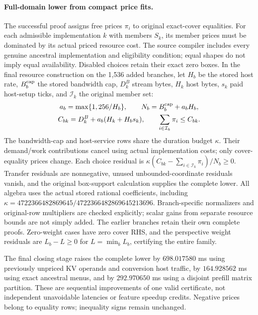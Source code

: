 \paragraph{Full-domain lower from compact price fits.}
The successful proof assigns free prices $\pi_i$ to original exact-cover
equalities. For each admissible implementation $k$ with members $S_k$, its
member prices must be dominated by its actual priced resource cost. The source
compiler includes every genuine ancestral implementation and eligibility
condition; equal shapes do not imply equal availability. Disabled choices retain
their exact zero boxes. In the final resource construction on the 1,536 added
branches, let $H_b$ be the stored host rate, $B_b^{\rm cap}$ the stored bandwidth
cap, $D_k^{B}$ stream bytes, $H_k$ host bytes, $s_k$ paid host-setup ticks,
and $\mathcal I_k$ the original member set:
\[
 \begin{gathered}
 a_b=\max\{1,256/H_b\},\qquad N_b=B_b^{\rm cap}+a_b H_b,\\
 C_{bk}=D_k^{B}+a_b(H_k+H_b s_k),\qquad
 \sum_{i\in\mathcal I_k}\pi_i\le C_{bk}.
 \end{gathered}
\]
The bandwidth-cap and host-service rows share the duration budget $\kappa$.
Their demand/work contributions cancel using actual implementation costs;
only cover-equality prices change. Each choice residual is
$\kappa(C_{bk}-\sum_{i\in\mathcal I_k}\pi_i)/N_b\ge0$.
Transfer residuals are nonnegative, unused unbounded-coordinate residuals
vanish, and the original box-support calculation supplies the complete lower.
All algebra uses the actual stored rational coefficients, including
$\kappa=4722366482869645/4722366482869645213696$.
Branch-specific normalizers and original-row multipliers are checked explicitly;
scalar gains from separate resource bounds are not simply added.
The earlier branches retain their own complete proofs. Zero-weight cases have
zero cover RHS, and the perspective weight residuals are $L_b-L\ge0$ for
$L=\min_bL_b$, certifying the entire family.

The final closing stage raises the complete lower by $698.017580$ ms using
previously unpriced KV operands and conversion host traffic, by $164.928562$ ms
using exact ancestral menus, and by $292.970650$ ms using a disjoint prefill
matrix partition. These are sequential improvements of one valid certificate,
not independent unavoidable latencies or feature speedup credits. Negative
prices belong to equality rows; inequality signs remain unchanged.

